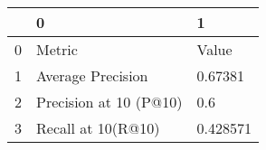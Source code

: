 \begin{tabular}{lll}
\toprule
{} &                       0 &         1 \\
\midrule
0 &                  Metric &     Value \\
1 &       Average Precision &   0.67381 \\
2 &  Precision at 10 (P@10) &       0.6 \\
3 &      Recall at 10(R@10) &  0.428571 \\
\bottomrule
\end{tabular}

